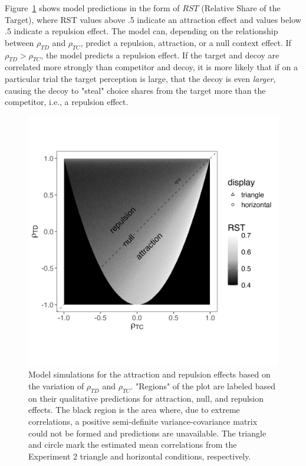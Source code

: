 Figure~\ref{fig:3d_model} shows model predictions in the form of $RST$ (Relative Share of the Target), where RST values above .5 indicate an attraction effect and values below .5 indicate a repulsion effect. The model can, depending on the relationship between $\rho_{TD}$ and $\rho_{TC}$, predict a repulsion, attraction, or a null context effect. If $\rho_{TD}>\rho_{TC}$, the model predicts a repulsion effect. If the target and decoy are correlated more strongly than competitor and decoy, it is more likely that if on a particular trial the target perception is large, that the decoy is even \textit{larger}, causing the decoy to "steal" choice shares from the target more than the competitor, i.e., a repulsion effect.

\begin{figure}
   \includegraphics[width=\linewidth]{figures/3d_sim_rst.jpg}
   \caption{Model simulations for the attraction and repulsion effects based on the variation of $\rho_{TD}$ and $\rho_{TC}$. "Regions" of the plot are labeled based on their qualitative predictions for attraction, null, and repulsion effects. The black region is the area where, due to extreme correlations, a positive semi-definite variance-covariance matrix could not be formed and predictions are unavailable. The triangle and circle mark the estimated mean correlations from the Experiment 2 triangle and horizontal conditions, respectively.}
   \label{fig:3d_model}
\end{figure}

